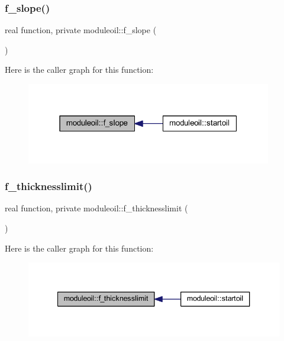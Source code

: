 \subsubsection{\texorpdfstring{f\+\_\+slope()}{f\_slope()}}
{\footnotesize\ttfamily real function, private moduleoil\+::f\+\_\+slope (\begin{DoxyParamCaption}{ }\end{DoxyParamCaption})\hspace{0.3cm}{\ttfamily [private]}}

Here is the caller graph for this function\+:\nopagebreak
\begin{figure}[H]
\begin{center}
\leavevmode
\includegraphics[width=304pt]{namespacemoduleoil_adabc2068ec1e8096747e483ba890f006_icgraph}
\end{center}
\end{figure}
\mbox{\label{namespacemoduleoil_a1e48ccf914b9fc3382e9fb87517e6a8d}} 
\subsubsection{\texorpdfstring{f\+\_\+thicknesslimit()}{f\_thicknesslimit()}}
{\footnotesize\ttfamily real function, private moduleoil\+::f\+\_\+thicknesslimit (\begin{DoxyParamCaption}{ }\end{DoxyParamCaption})\hspace{0.3cm}{\ttfamily [private]}}

Here is the caller graph for this function\+:\nopagebreak
\begin{figure}[H]
\begin{center}
\leavevmode
\includegraphics[width=340pt]{namespacemoduleoil_a1e48ccf914b9fc3382e9fb87517e6a8d_icgraph}
\end{center}
\end{figure}
\mbox{\label{namespacemoduleoil_abeaffbf39f30e3630cefa9fdf3a69e82}} 
